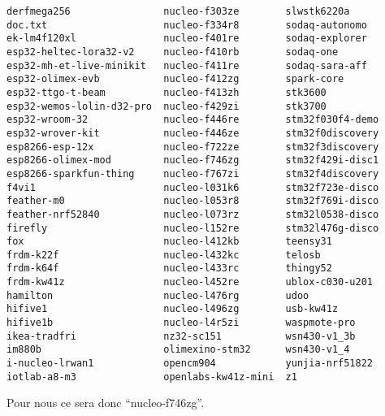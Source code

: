 {\begin{verbatim}
derfmega256                nucleo-f303ze        slwstk6220a
doc.txt                    nucleo-f334r8        sodaq-autonomo
ek-lm4f120xl               nucleo-f401re        sodaq-explorer
esp32-heltec-lora32-v2     nucleo-f410rb        sodaq-one
esp32-mh-et-live-minikit   nucleo-f411re        sodaq-sara-aff
esp32-olimex-evb           nucleo-f412zg        spark-core
esp32-ttgo-t-beam          nucleo-f413zh        stk3600
esp32-wemos-lolin-d32-pro  nucleo-f429zi        stk3700
esp32-wroom-32             nucleo-f446re        stm32f030f4-demo
esp32-wrover-kit           nucleo-f446ze        stm32f0discovery
esp8266-esp-12x            nucleo-f722ze        stm32f3discovery
esp8266-olimex-mod         nucleo-f746zg        stm32f429i-disc1
esp8266-sparkfun-thing     nucleo-f767zi        stm32f4discovery
f4vi1                      nucleo-l031k6        stm32f723e-disco
feather-m0                 nucleo-l053r8        stm32f769i-disco
feather-nrf52840           nucleo-l073rz        stm32l0538-disco
firefly                    nucleo-l152re        stm32l476g-disco
fox                        nucleo-l412kb        teensy31
frdm-k22f                  nucleo-l432kc        telosb
frdm-k64f                  nucleo-l433rc        thingy52
frdm-kw41z                 nucleo-l452re        ublox-c030-u201
hamilton                   nucleo-l476rg        udoo
hifive1                    nucleo-l496zg        usb-kw41z
hifive1b                   nucleo-l4r5zi        waspmote-pro
ikea-tradfri               nz32-sc151           wsn430-v1_3b
im880b                     olimexino-stm32      wsn430-v1_4
i-nucleo-lrwan1            opencm904            yunjia-nrf51822
iotlab-a8-m3               openlabs-kw41z-mini  z1
\end{verbatim}
}
Pour nous ce sera donc \enquote{nucleo-f746zg}.\\

